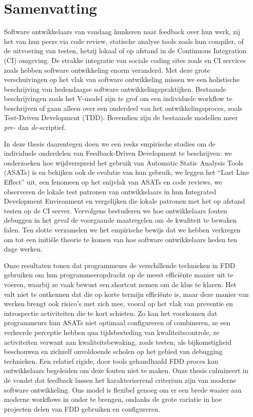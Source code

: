\chapter*{Samenvatting}

{

Software ontwikkelaars van vandaag hunkeren naar feedback over hun werk, zij het van hun peers via
code review, statische analyse tools zoals hun compiler, of de uitvoering van testen, hetzij
lokaal of op afstand in de Continuous Integration (CI) omgeving. De strakke integratie van sociale
coding sites zoals \github en CI services zoals \travis hebben software ontwikkeling enorm
veranderd. Met deze grote verschuivingen op het vlak van software ontwikkeling missen we een
holistische beschrijving van hedendaagse software ontwikkelingspraktijken. Bestaande beschrijvingen
zoals het V-model zijn te grof om een individuele workflow te beschrijven of gaan alleen over een
onderdeel van het ontwikkelingsproces, zoals Test-Driven Development (TDD). Bovendien zijn de
bestaande modellen meer \emph{pre-} dan \emph{de-}scriptief.

In deze thesis daarentegen doen we een reeks empirische studies om de individuele onderdelen van
Feedback-Driven Development te beschrijven: we onderzoeken hoe wijdverspreid het gebruik van
Automatic Static Analysis Tools (ASATs) is en bekijken ook de evolutie van hun gebruik, we leggen
het ``Last Line Effect'' uit, een fenomeen op het snijvlak van ASATs en code reviews, we observeren
de lokale test patronen van ontwikkelaars in hun Integrated Development Environment en vergelijken
die lokale patronen met het op afstand testen op de CI server. Vervolgens bestuderen we hoe
ontwikkelaars fouten debuggen in het geval de voorgaande maatregelen om de kwaliteit te bewaken
falen. Ten slotte verzamelen we het empirische bewijs dat we hebben verkregen om tot een initi{\"e}le
theorie te komen van hoe software ontwikkelaars heden ten dage werken.


Onze resultaten tonen dat programmeurs de verschillende technieken in FDD gebruiken om hun
programmeeropdracht op de meest effici{\"e}nte manier uit te voeren, waarbij ze vaak bewust een
shortcut nemen om de klus te klaren. Het valt niet te ontkennen dat die op korte termijn effici{\"e}nte
is, maar deze manier van werken brengt ook risico’s met zich mee, vooral op het vlak van preventie
en introspectie activiteiten die te kort schieten. Zo kan het voorkomen dat programmeurs hun ASATs
niet optimaal configureren of combineren, ze een verkeerde perceptie hebben qua tijdsbesteding van
kwaliteitscontrole, ze activiteiten verwant aan kwaliteitsbewaking, zoals testen, als
bijkomstigheid beschouwen en zichzelf onvoldoende scholen op het gebied van debugging
technieken. Een relatief rigide, door tools gehandhaafd FDD proces kan ontwikkelaars begeleiden om
deze fouten niet te maken. Onze thesis culmineert in de vondst dat feedback lussen het
karakteriserend criterium zijn van moderne software ontwikkeling. Ons model is flexibel genoeg om
er een brede waaier aan moderne workflows in onder te brengen, ondanks de grote variatie in hoe
projecten delen van FDD gebruiken en configureren.}



